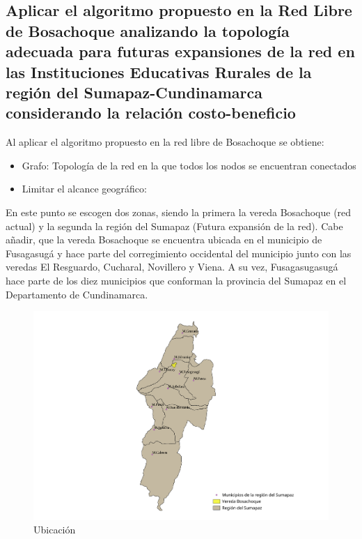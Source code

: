\documentclass[]{article}
\begin{document}
\subsection{Aplicar el algoritmo propuesto en la Red Libre de Bosachoque
analizando la topología adecuada para futuras expansiones de la red en
las Instituciones Educativas Rurales de la región del
Sumapaz-Cundinamarca considerando la relación
costo-beneficio}\label{aplicar-el-algoritmo-propuesto-en-la-red-libre-de-bosachoque-analizando-la-topologuxeda-adecuada-para-futuras-expansiones-de-la-red-en-las-instituciones-educativas-rurales-de-la-regiuxf3n-del-sumapaz-cundinamarca-considerando-la-relaciuxf3n-costo-beneficio}

Al aplicar el algoritmo propuesto en la red libre de Bosachoque se
obtiene:

\begin{itemize}
\item
  Grafo: Topología de la red en la que todos los nodos se encuentran
  conectados
\item
  Limitar el alcance geográfico:
\end{itemize}

En este punto se escogen dos zonas, siendo la primera la vereda
Bosachoque (red actual) y la segunda la región del Sumapaz (Futura
expansión de la red). Cabe añadir, que la vereda Bosachoque se encuentra
ubicada en el municipio de Fusagasugá y hace parte del corregimiento
occidental del municipio junto con las veredas El Resguardo, Cucharal,
Novillero y Viena. A su vez, Fusagasugasugá hace parte de los diez
municipios que conforman la provincia del Sumapaz en el Departamento de
Cundinamarca.

\begin{figure}
\centering
\includegraphics{Bosachoque_sumapaz.pdf}
\caption{Ubicación}
\end{figure}
\end{document}
